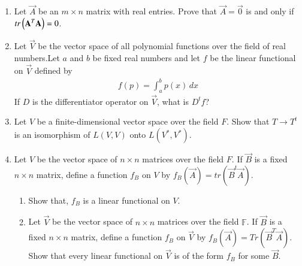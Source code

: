 \begin{enumerate}[label=\thesubsection.\arabic*.,ref=\thesubsection.\theenumi]
%
\\
\solution

\item Let $\vec{A}$ be an $m\times n$ matrix with real entries. Prove that $\vec{A}=\vec{0}$ is and only if $tr\left(\mathbf{A}^T\mathbf{A}\right)=0$.
%
\\
\solution

\item Let $\vec{V}$ be the vector space of all polynomial functions over the field of real numbers.Let $a$ and $b$ be fixed real numbers and let $f$ be the linear functional on $\vec{V}$ defined by 
\begin{align}
    f(p)=\int_a ^b p(x) \,dx
\end{align}
If $D$ is the differentiator operator on $\vec{V}$, what is $D^tf$?
%
\\
\solution

\item Let $V$ be a finite-dimensional vector space over the field $F$. Show that $T \rightarrow T^t$ is an isomorphism of $L(V,V)$ onto $L(V^*,V^*)$.
%
\\
\solution

\item Let $V$ be the vector space of $n\times n$ matrices over the field $F$. If $\vec{B}$ is a fixed $n\times n$ matrix, define a function $f_B$ on $V$ by $f_B(\vec{A})= tr(\vec{B}^t \vec{A})$. 
%
\begin{enumerate}
\item Show that, $f_B$ is a linear functional on $V$.
\\
\solution

\item Let $\vec{V}$ be the vector space of $n \times n$ matrices over the field $\mathbb{F}$. If $\Vec{B}$ is a fixed $n \times n$ matrix, define a function $f_B$ on $\vec{V}$ by $f_B(\Vec{A})=\textit{Tr}(\Vec{B}^T\vec{A})$. Show that every linear functional on $\vec{V}$ is of the form $f_B$
for some $\vec{B}$.
%
\\
\solution

\end{enumerate}
\end{enumerate}
